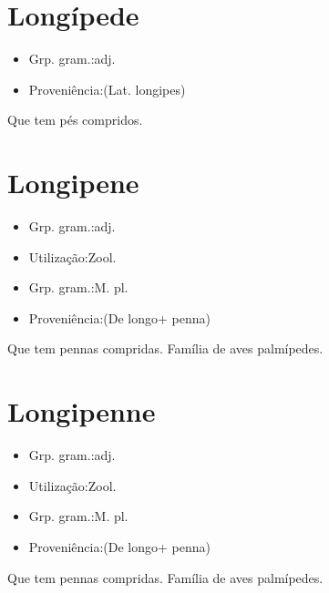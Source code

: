 \section{Longípede}
\begin{itemize}
\item {Grp. gram.:adj.}
\end{itemize}
\begin{itemize}
\item {Proveniência:(Lat. \textunderscore longipes\textunderscore )}
\end{itemize}
Que tem pés compridos.
\section{Longipene}
\begin{itemize}
\item {Grp. gram.:adj.}
\end{itemize}
\begin{itemize}
\item {Utilização:Zool.}
\end{itemize}
\begin{itemize}
\item {Grp. gram.:M. pl.}
\end{itemize}
\begin{itemize}
\item {Proveniência:(De \textunderscore longo\textunderscore  + \textunderscore penna\textunderscore )}
\end{itemize}
Que tem pennas compridas.
Família de aves palmípedes.
\section{Longipenne}
\begin{itemize}
\item {Grp. gram.:adj.}
\end{itemize}
\begin{itemize}
\item {Utilização:Zool.}
\end{itemize}
\begin{itemize}
\item {Grp. gram.:M. pl.}
\end{itemize}
\begin{itemize}
\item {Proveniência:(De \textunderscore longo\textunderscore  + \textunderscore penna\textunderscore )}
\end{itemize}
Que tem pennas compridas.
Família de aves palmípedes.
